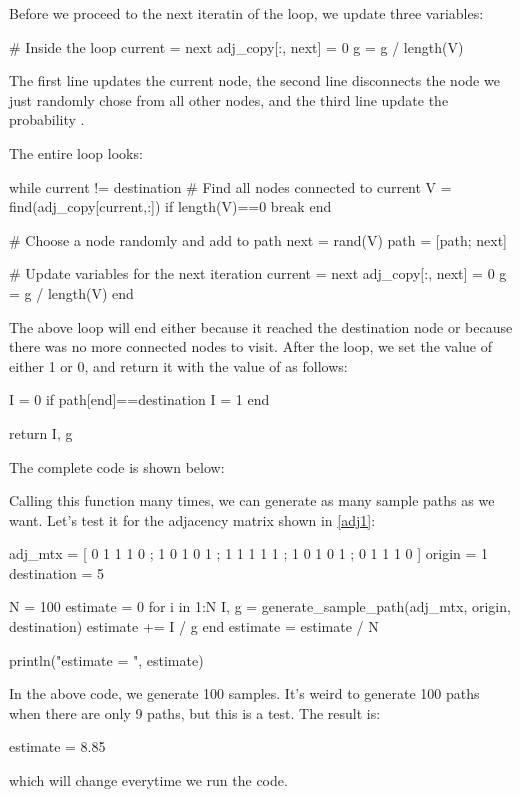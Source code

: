 Before we proceed to the next iteratin of the loop, we update three variables:
\begin{code}
# Inside the loop
current = next
adj_copy[:, next] = 0
g = g / length(V)
\end{code}
\noindent The first line updates the current node, the second line disconnects the node we just randomly chose from all other nodes, and the third line update the probability .

The entire  loop looks:
\begin{code}
while current != destination
    # Find all nodes connected to current
    V = find(adj_copy[current,:])
    if length(V)==0
        break
    end

    # Choose a node randomly and add to path
    next = rand(V)
    path = [path; next]

    # Update variables for the next iteration
    current = next
    adj_copy[:, next] = 0
    g = g / length(V)
end
\end{code}

The above  loop will end either because it reached the destination node or because there was no more connected nodes to visit. After the loop, we set the value of  either 1 or 0, and return it with the value of  as follows:
\begin{code}
I = 0
if path[end]==destination
    I = 1
end

return I, g
\end{code}

The complete code is shown below:
\begin{codelisting}
\end{codelisting}

Calling this function many times, we can generate as many sample paths as we want. Let's test it for the adjacency matrix shown in \eqref{adj1}:
\begin{code}
adj_mtx = [
0 1 1 1 0 ;
1 0 1 0 1 ;
1 1 1 1 1 ;
1 0 1 0 1 ;
0 1 1 1 0
]
origin = 1
destination = 5

N = 100
estimate = 0
for i in 1:N
    I, g = generate_sample_path(adj_mtx, origin, destination)
    estimate += I / g
end
estimate = estimate / N

println("estimate = ", estimate)
\end{code}
\noindent In the above code, we generate 100 samples. It's weird to generate 100 paths when there are only 9 paths, but this is a test. The result is:
\begin{code}
estimate = 8.85
\end{code}
\noindent which will change everytime we run the code.

